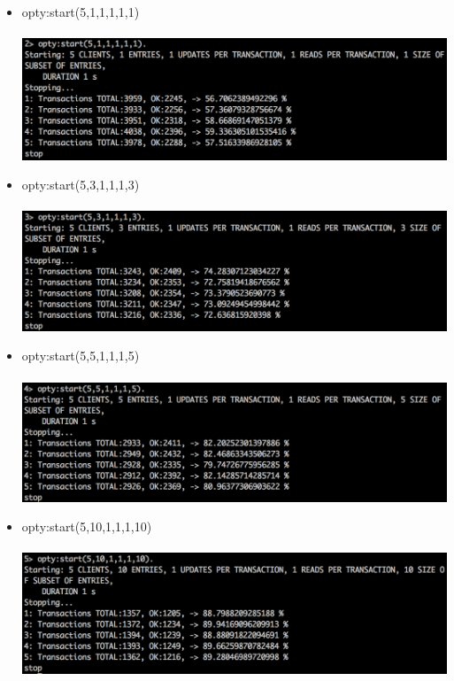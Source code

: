 \documentclass[a4paper, 11pt]{article}
\begin{document}
\begin{itemize}
\item opty:start(5,1,1,1,1,1)\\\\
\includegraphics[scale=0.5]{images/exp-ii-1.png} \\
\item opty:start(5,3,1,1,1,3)\\\\
\includegraphics[scale=0.5]{images/exp-ii-2.png} \\
\item opty:start(5,5,1,1,1,5)\\\\
\includegraphics[scale=0.5]{images/exp-ii-3.png} \\
\newpage
\item opty:start(5,10,1,1,1,10)\\\\
\includegraphics[scale=0.5]{images/exp-ii-4.png} \\

\end{itemize}
\end{document}
